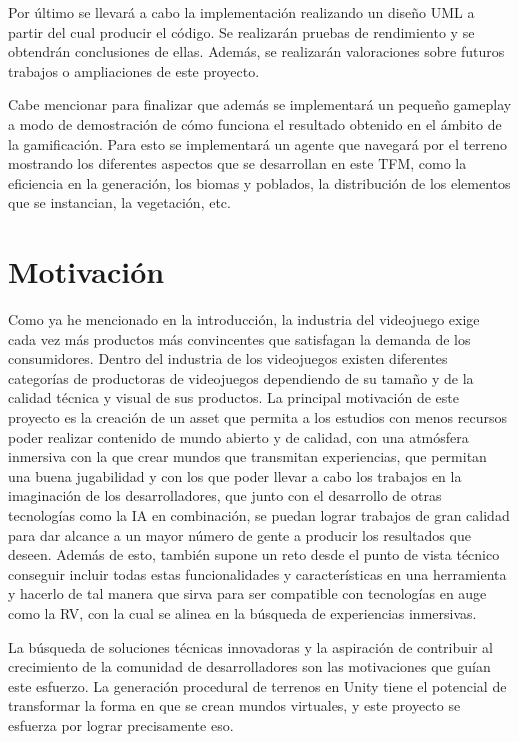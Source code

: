 Por último se llevará a cabo la implementación realizando un diseño UML a partir del cual producir el código. Se realizarán pruebas de rendimiento y se obtendrán conclusiones de ellas. Además, se realizarán valoraciones sobre futuros trabajos o ampliaciones de este proyecto.

Cabe mencionar para finalizar que además se implementará un pequeño gameplay a modo de demostración de cómo funciona el resultado obtenido en el ámbito de la gamificación. Para esto se implementará un agente que navegará por el terreno mostrando los diferentes aspectos que se desarrollan en este TFM, como la eficiencia en la generación, los biomas y poblados, la distribución de los elementos que se instancian, la vegetación, etc.
\section{Motivación}

Como ya he mencionado en la introducción, la industria del videojuego exige cada vez más productos más convincentes que satisfagan la demanda de los consumidores. Dentro del industria de los videojuegos existen diferentes categorías de productoras de videojuegos dependiendo de su tamaño y de la calidad técnica y visual de sus productos. La principal motivación de este proyecto es la creación de un asset que permita a los estudios con menos recursos poder realizar contenido de mundo abierto y de calidad, con una atmósfera inmersiva con la que crear mundos que transmitan experiencias, que permitan una buena jugabilidad y con los que poder llevar a cabo los trabajos en la imaginación de los desarrolladores, que junto con el desarrollo de otras tecnologías como la IA en combinación, se puedan lograr trabajos de gran calidad para dar alcance a un mayor número de gente a producir los resultados que deseen. Además de esto, también supone un reto desde el punto de vista técnico conseguir incluir todas estas funcionalidades y características en una herramienta y hacerlo de tal manera que sirva para ser compatible con tecnologías en auge como la RV, con la cual se alinea en la búsqueda de experiencias inmersivas. 

La búsqueda de soluciones técnicas innovadoras y la aspiración de contribuir al crecimiento de la comunidad de desarrolladores son las motivaciones que guían este esfuerzo. La generación procedural de terrenos en Unity tiene el potencial de transformar la forma en que se crean mundos virtuales, y este proyecto se esfuerza por lograr precisamente eso.
\newpage
